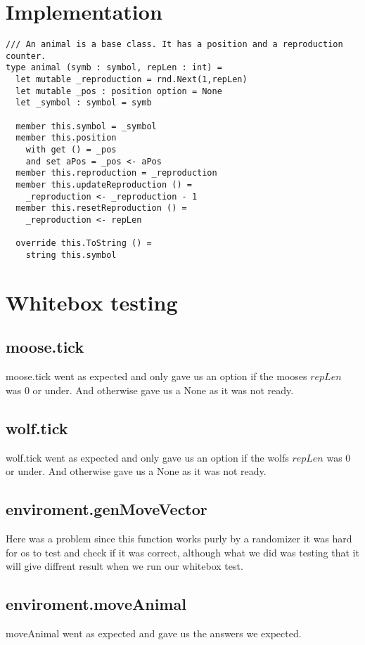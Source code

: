 \documentclass{article}
\begin{document}
    \section{Implementation}
		\lstset{language=FSharp}

		\begin{lstlisting}
/// An animal is a base class. It has a position and a reproduction counter.
type animal (symb : symbol, repLen : int) =
  let mutable _reproduction = rnd.Next(1,repLen)
  let mutable _pos : position option = None
  let _symbol : symbol = symb

  member this.symbol = _symbol
  member this.position
    with get () = _pos
    and set aPos = _pos <- aPos
  member this.reproduction = _reproduction
  member this.updateReproduction () =
    _reproduction <- _reproduction - 1
  member this.resetReproduction () =
    _reproduction <- repLen

  override this.ToString () =
    string this.symbol
		\end{lstlisting}
		
         
\section{Whitebox testing}
    \subsection{moose.tick}
    moose.tick went as expected and only gave us an option if the mooses $repLen$ was 0 or under. And otherwise gave us a None as it was not ready.
    
    \subsection{wolf.tick}
    wolf.tick went as expected and only gave us an option if the wolfs $repLen$ was 0 or under. And otherwise gave us a None as it was not ready.
    
    \subsection{enviroment.genMoveVector}
    Here was a problem since this function works purly by a randomizer it was hard for os to test and check if it was correct, although what we did was testing that it will give diffrent result when we run our whitebox test.
    
    \subsection{enviroment.moveAnimal}
    moveAnimal went as expected and gave us the answers we expected.
    
\end{document}
